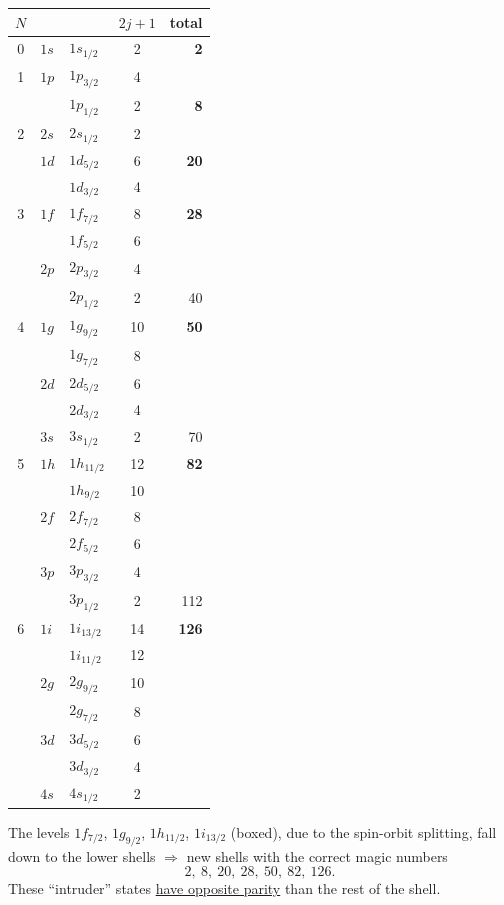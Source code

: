 \documentclass[11pt,a4paper]{article}
\begin{document}
\begin{center}
\begin{tabular}{c l l c r}
$N$ & & & $2j+1$ & total\\ \hline
0 & $1s$ & $1s_{1/2}$ & 2 & \textbf{2} \\ \hline
1 & $1p$ & $1p_{3/2}$ & 4 & \\
  &      & $1p_{1/2}$ & 2 & \textbf{8} \\ \hline
2 & $2s$ & $2s_{1/2}$ & 2 & \\
  & $1d$ & $1d_{5/2}$ & 6 & \textbf{20}\\
  &      & $1d_{3/2}$ & 4 & \\ \hline
3 & $1f$ & $\boxed{1f_{7/2}}$ & 8 & \textbf{28}\\
  &      & $1f_{5/2}$ & 6 & \\
  & $2p$ & $2p_{3/2}$ & 4 & \\
  &      & $2p_{1/2}$ & 2 & 40 \\ \hline
4 & $1g$ & $\boxed{1g_{9/2}}$ & 10 & \textbf{50}\\
  &      & $1g_{7/2}$ & 8 & \\
  & $2d$ & $2d_{5/2}$ & 6 & \\
  &      & $2d_{3/2}$ & 4 & \\
  & $3s$ & $3s_{1/2}$ & 2 & 70\\ \hline
5 & $1h$ & $\boxed{1h_{11/2}}$ & 12 & \textbf{82}\\
  &      & $1h_{9/2}$ & 10 & \\
  & $2f$ & $2f_{7/2}$ & 8 & \\
  &      & $2f_{5/2}$ & 6 & \\
  & $3p$ & $3p_{3/2}$ & 4 & \\
  &      & $3p_{1/2}$ & 2 & 112\\ \hline
6 & $1i$ & $\boxed{1i_{13/2}}$ & 14 & \textbf{126}\\
  &      & $1i_{11/2}$ & 12 & \\
  & $2g$ & $2g_{9/2}$ & 10 & \\
  &      & $2g_{7/2}$ & 8 & \\
  & $3d$ & $3d_{5/2}$ & 6 & \\
  &      & $3d_{3/2}$ & 4 & \\
  & $4s$ & $4s_{1/2}$ & 2 & \\ \hline
\end{tabular}
\end{center}
The levels $1f_{7/2}$, $1g_{9/2}$, $1h_{11/2}$, $1i_{13/2}$ (boxed), due to the spin-orbit splitting, fall down to the lower shells $\Rightarrow$ new shells with the correct magic numbers
\[
2,\ 8,\ 20,\ 28,\ 50,\ 82,\ 126 .
\]
These ``intruder'' states \underline{have opposite parity} than the rest of the shell.
\end{document}
